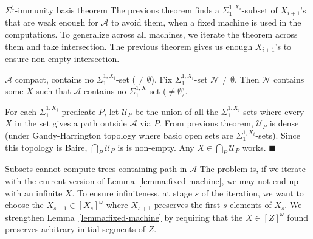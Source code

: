 \begin{frame}{$\Sigma_1^1$-immunity basis theorem}
  The previous theorem finds a $\Sigma_1^{1,X_i}$-subset of $X_{i+1}$'s
  that are weak enough for $\mathcal{A}$ to avoid them, when a fixed
  machine is used in the computations. To generalize across all machines,
  we iterate the theorem across them and take intersection. The previous
  theorem gives us enough $X_{i+1}$'s to ensure non-empty intersection.

  \vspace{1em}
  \begin{immunity*}
    $\mathcal{A}$ compact, contains no $\Sigma_1^{1,X_i}$-set
    ($\neq\emptyset$). Fix $\Sigma_1^{1,X_i}$-set
    $\mathcal{N}\neq\emptyset$. Then $\mathcal{N}$ contains some $X$ such
    that $\mathcal{A}$ contains no $\Sigma_1^{1,X}$-set ($\neq\emptyset$).
  \end{immunity*}

  \vspace{1em}
  For each $\Sigma_1^{1,X_i}$-predicate $P$, let $\mathcal{U}_P$ be the
  union of all the $\Sigma_1^{1,X_i}$-sets where every $X$ in the set gives
  a path outside $\mathcal{A}$ via $P$. From previous theorem,
  $\mathcal{U}_P$ is dense (under Gandy-Harrington topology where basic
  open sets are $\Sigma_1^{1,X_i}$-sets). Since this topology is Baire,
  $\bigcap_P\mathcal{U}_P$ is is non-empty. Any
  $X\in\bigcap_P\mathcal{U}_P$ works. $\blacksquare$
\end{frame}

\begin{frame}{Subsets cannot compute trees containing path in $\mathcal{A}$}
  The problem is, if we iterate with the current version of
  Lemma~\ref{lemma:fixed-machine}, we may not end up with an infinite $X$.
  To ensure infiniteness, at stage $s$ of the iteration, we want to choose
  the $X_{s+1}\in[X_s]^\omega$ where $X_{s+1}$ preserves the first
  $s$-elements of $X_s$. We strengthen Lemma~\ref{lemma:fixed-machine} by
  requiring that the $X\in[Z]^\omega$ found preserves arbitrary initial
  segments of $Z$.
\end{frame}

